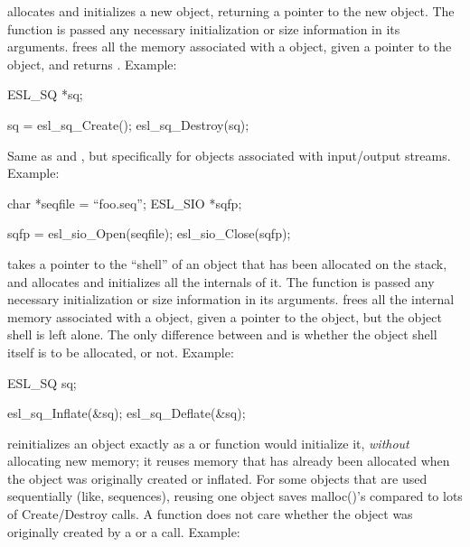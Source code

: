 \begin{sreitems}{}
\item [\ccode{Create,Destroy}] 
   allocates and initializes a new 
  object, returning a pointer to the new
  object. The  function is passed any necessary
  initialization or size information in its arguments.
   frees all the memory associated
  with a  object,  given a pointer to the object,
  and returns . Example:

\begin{cchunk}
ESL_SQ *sq;

sq = esl_sq_Create();
esl_sq_Destroy(sq);
\end{cchunk}
  


\item [\ccode{Open,Close}] 
  Same as  and , but specifically for
  objects associated with input/output streams. Example:

\begin{cchunk}
char        *seqfile = ``foo.seq'';
ESL_SIO     *sqfp;

sqfp = esl_sio_Open(seqfile);
esl_sio_Close(sqfp);
\end{cchunk}



\item [\ccode{Inflate,Deflate}]
   takes a pointer to the ``shell'' of an
   object that has been allocated on the stack, and
  allocates and initializes all the internals of it. The
   function is passed any necessary initialization or
  size information in its arguments.  
  frees all the internal memory associated with a  object,
  given a pointer to the object, but the object shell is left alone.
  The only difference between  and
   is whether the object shell itself is to be
  allocated, or not. Example:

\begin{cchunk}
ESL_SQ  sq;

esl_sq_Inflate(&sq);
esl_sq_Deflate(&sq);
\end{cchunk}



\item [\ccode{Reuse}] 
    reinitializes an object exactly as a
    or  function would initialize it, \emph{without}
   allocating new memory; it reuses memory that has
   already been allocated when the object was originally created or
   inflated. For some objects that are used sequentially (like,
   sequences), reusing one object saves malloc()'s compared to
   lots of Create/Destroy calls. A  function does not
   care whether the object was originally created by a 
   or a  call. Example:


\end{sreitems}
